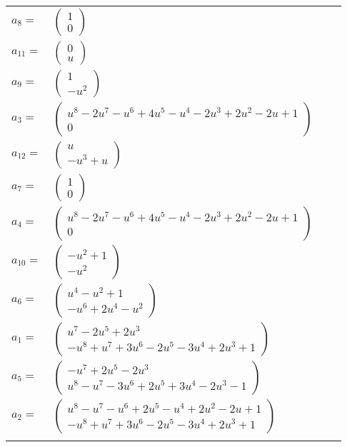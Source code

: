 \documentclass[1p]{elsarticle_modified}
\theoremstyle{definition}
\begin{document}
\begin{tabular}{m{7pt} m{180pt} m{7pt} m{180pt} }
\flushright $a_{8}=$&$\begin{pmatrix}1\\0\end{pmatrix}$ \\
\flushright $a_{11}=$&$\begin{pmatrix}0\\u\end{pmatrix}$ \\
\flushright $a_{9}=$&$\begin{pmatrix}1\\- u^2\end{pmatrix}$ \\
\flushright $a_{3}=$&$\begin{pmatrix}u^8-2 u^7- u^6+4 u^5- u^4-2 u^3+2 u^2-2 u+1\\0\end{pmatrix}$ \\
\flushright $a_{12}=$&$\begin{pmatrix}u\\- u^3+u\end{pmatrix}$ \\
\flushright $a_{7}=$&$\begin{pmatrix}1\\0\end{pmatrix}$ \\
\flushright $a_{4}=$&$\begin{pmatrix}u^8-2 u^7- u^6+4 u^5- u^4-2 u^3+2 u^2-2 u+1\\0\end{pmatrix}$ \\
\flushright $a_{10}=$&$\begin{pmatrix}- u^2+1\\- u^2\end{pmatrix}$ \\
\flushright $a_{6}=$&$\begin{pmatrix}u^4- u^2+1\\- u^6+2 u^4- u^2\end{pmatrix}$ \\
\flushright $a_{1}=$&$\begin{pmatrix}u^7-2 u^5+2 u^3\\- u^8+u^7+3 u^6-2 u^5-3 u^4+2 u^3+1\end{pmatrix}$ \\
\flushright $a_{5}=$&$\begin{pmatrix}- u^7+2 u^5-2 u^3\\u^8- u^7-3 u^6+2 u^5+3 u^4-2 u^3-1\end{pmatrix}$ \\
\flushright $a_{2}=$&$\begin{pmatrix}u^8- u^7- u^6+2 u^5- u^4+2 u^2-2 u+1\\- u^8+u^7+3 u^6-2 u^5-3 u^4+2 u^3+1\end{pmatrix}$\\&\end{tabular}
\end{document}
